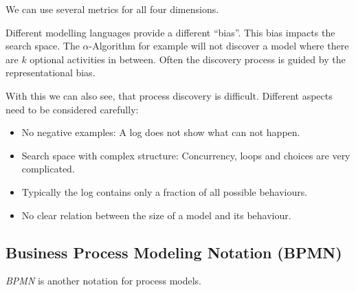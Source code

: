 \documentclass[english]{panikzettel}
\begin{document}
We can use several metrics for all four dimensions.

Different modelling languages provide a different ``bias''. This bias impacts the search space. The $\alpha$-Algorithm for example will not discover a model where there are $k$ optional activities in between. Often the discovery process is guided by the representational bias.

With this we can also see, that process discovery is difficult. Different aspects need to be considered carefully:
\begin{itemize}
    \item No negative examples: A log does not show what can not happen.
    \item Search space with complex structure: Concurrency, loops and choices are very complicated.
    \item Typically the log contains only a fraction of all possible behaviours.
    \item No clear relation between the size of a model and its behaviour.
\end{itemize}

\subsection{Business Process Modeling Notation (BPMN)}

\emph{BPMN} is another notation for process models.
\end{document}
